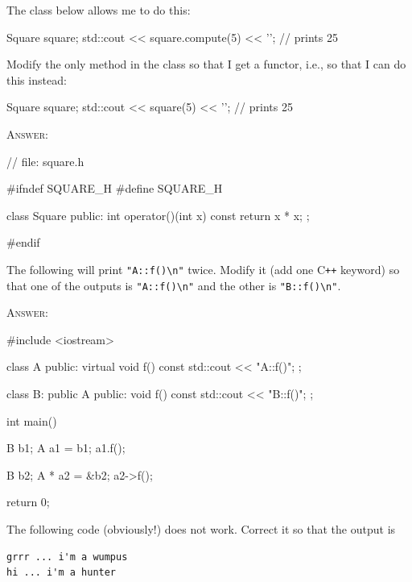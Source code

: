\newpage
\nextq
The class below allows me to do this:
\begin{console}[fontsize=\small]
Square square;
std::cout << square.compute(5) << '\n'; // prints 25
\end{console}
Modify the only method in the class so that I get a functor, i.e.,
so that I can do this instead:
\begin{console}[fontsize=\small]
Square square;
std::cout << square(5) << '\n'; // prints 25
\end{console}

\textsc{Answer:}
\begin{answercode}
// file: square.h

#ifndef SQUARE_H
#define SQUARE_H

class Square
{
  public:
  int operator()(int x) const
  {
    return x * x;
  }
};

#endif
\end{answercode}

\newpage
\nextq
The following will print \verb!"A::f()\n"! twice.
Modify it (add one C\texttt{++} keyword) so that one of the outputs is
\verb!"A::f()\n"! and the other is \verb!"B::f()\n"!. 

\textsc{Answer:}
\begin{answercode}
#include <iostream>

class A
{
public:
    virtual void f() const
    {
        std::cout << "A::f()\n";
    }
};

class B: public A
{
public:
    void f() const
    {
        std::cout << "B::f()\n";
    }
};

int main()
{
    B b1;
    A a1 = b1; 
    a1.f();

    B b2;
    A * a2 = &b2;
    a2->f();

    return 0;
}
\end{answercode}

\newpage
\nextq
The following code (obviously!) does not work.
Correct it so that the output is
\begin{Verbatim}[frame=single,fontsize=\footnotesize]
grrr ... i'm a wumpus
hi ... i'm a hunter
\end{Verbatim}

